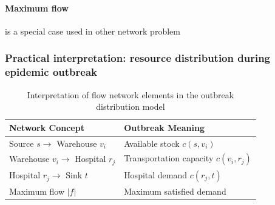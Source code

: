 \paragraph{Maximum flow} is a special case used in other network problem


\subsubsection{Practical interpretation: resource distribution during epidemic outbreak}
\begin{table}[h]
\centering
\begin{tabular}{|l|l|}
\hline
\textbf{Network Concept} & \textbf{Outbreak Meaning} \\
\hline
Source $s \rightarrow$ Warehouse $v_i$ & Available stock $c(s,v_i)$ \\
\hline
Warehouse $v_i \rightarrow$ Hospital $r_j$ & Transportation capacity $c(v_i,r_j)$ \\
\hline
Hospital $r_j \rightarrow$ Sink $t$ & Hospital demand $c(r_j,t)$ \\
\hline
Maximum flow $|f|$ & Maximum satisfied demand \\
\hline
\end{tabular}
\caption{Interpretation of flow network elements in the outbreak distribution model}
\end{table}

